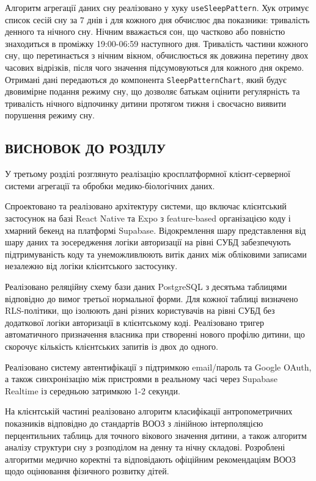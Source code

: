Алгоритм агрегації даних сну реалізовано у хуку \texttt{useSleepPattern}. Хук отримує список сесій сну за 7 днів і для кожного дня обчислює два показники: тривалість денного та нічного сну. Нічним вважається сон, що частково або повністю знаходиться в проміжку 19:00-06:59 наступного дня. Тривалість частини кожного сну, що перетинається з нічним вікном, обчислюється як довжина перетину двох часових відрізків, після чого значення підсумовуються для кожного дня окремо. Отримані дані передаються до компонента \texttt{SleepPatternChart}, який будує двовимірне подання режиму сну, що дозволяє батькам оцінити регулярність та тривалість нічного відпочинку дитини протягом тижня і своєчасно виявити порушення режиму сну.

\begin{conclusionsection}

\section{ВИСНОВОК ДО РОЗДІЛУ}

У третьому розділі розглянуто реалізацію кросплатформної клієнт-серверної системи агрегації та обробки медико-біологічних даних.

Спроектовано та реалізовано архітектуру системи, що включає клієнтський застосунок на базі React Native та Expo з feature-based організацією коду і хмарний бекенд на платформі Supabase. Відокремлення шару представлення від шару даних та зосередження логіки авторизації на рівні \gls{СУБД} забезпечують підтримуваність коду та унеможливлюють витік даних між обліковими записами незалежно від логіки клієнтського застосунку.

Реалізовано реляційну схему бази даних PostgreSQL з десятьма таблицями відповідно до вимог третьої нормальної форми. Для кожної таблиці визначено \gls{RLS}-політики, що ізолюють дані різних користувачів на рівні \gls{СУБД} без додаткової логіки авторизації в клієнтському коді. Реалізовано тригер автоматичного призначення власника при створенні нового профілю дитини, що скорочує кількість клієнтських запитів із двох до одного.

Реалізовано систему автентифікації з підтримкою email/пароль та Google OAuth, а також синхронізацію між пристроями в реальному часі через Supabase Realtime із середньою затримкою 1-2 секунди.

На клієнтській частині реалізовано алгоритм класифікації антропометричних показників відповідно до стандартів \gls{ВООЗ} з лінійною інтерполяцією перцентильних таблиць для точного вікового значення дитини, а також алгоритм аналізу структури сну з розподілом на денну та нічну складові. Розроблені алгоритми медично коректні та відповідають офіційним рекомендаціям \gls{ВООЗ} щодо оцінювання фізичного розвитку дітей.

\end{conclusionsection}
